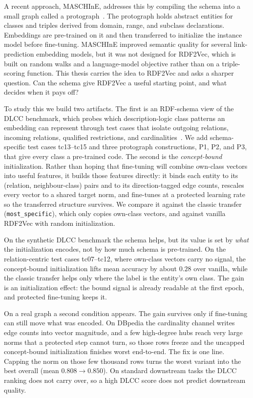 \documentclass[a4paper,oneside,bibliography=totoc]{scrbook}
\begin{document}
A recent approach, MASCHInE, addresses this by compiling the schema into a small
graph called a protograph~\cite{hubert2023maschine}. The protograph holds
abstract entities for classes and triples derived from domain, range, and
subclass declarations. Embeddings are pre-trained on it and then transferred to
initialize the instance model before fine-tuning. MASCHInE improved semantic
quality for several link-prediction embedding models, but it was not designed for
RDF2Vec, which is built on random walks and a language-model objective rather
than on a triple-scoring function. This thesis carries the idea to RDF2Vec and
asks a sharper question. Can the schema give RDF2Vec a useful starting point, and
what decides when it pays off?

To study this we build two artifacts. The first is an RDF-schema view of the DLCC
benchmark, which probes which description-logic class patterns an embedding can
represent through test cases that isolate outgoing relations, incoming relations,
qualified restrictions, and cardinalities~\cite{portisch_dlcc_2022}. We add
schema-specific test cases tc13--tc15 and three protograph constructions, P1, P2,
and P3, that give every class a pre-trained code. The second is the
\emph{concept-bound} initialization. Rather than hoping that fine-tuning will
combine own-class vectors into useful features, it builds those features
directly: it binds each entity to its (relation, neighbour-class) pairs and to
its direction-tagged edge counts, rescales every vector to a shared target norm,
and fine-tunes at a protected learning rate so the transferred structure
survives. We compare it against the classic transfer (\texttt{most\_specific}),
which only copies own-class vectors, and against vanilla RDF2Vec with random
initialization.

On the synthetic DLCC benchmark the schema helps, but its value is set by
\emph{what} the initialization encodes, not by how much schema is pre-trained. On
the relation-centric test cases tc07--tc12, where own-class vectors carry no
signal, the concept-bound initialization lifts mean accuracy by about $0.28$ over
vanilla, while the classic transfer helps only where the label is the entity's
own class. The gain is an initialization effect: the bound signal is already
readable at the first epoch, and protected fine-tuning keeps it.

On a real graph a second condition appears. The gain survives only if fine-tuning
can still move what was encoded. On DBpedia the cardinality channel writes edge
counts into vector magnitude, and a few high-degree hubs reach very large norms
that a protected step cannot turn, so those rows freeze and the uncapped
concept-bound initialization finishes worst end-to-end. The fix is one line.
Capping the norm on those few thousand rows turns the worst variant into the best
overall (mean $0.808 \rightarrow 0.850$). On standard downstream tasks the DLCC
ranking does not carry over, so a high DLCC score does not predict downstream
quality.
\end{document}
